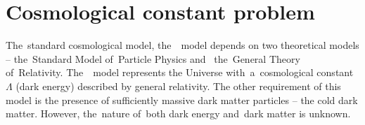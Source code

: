 \section{Cosmological constant problem}
The~standard cosmological model, the~\LCDM\ model depends on two theoretical models -- the~Standard Model of~Particle Physics and~ the~General Theory of~Relativity. The~\LCDM\ model represents the Universe with~a~cosmological constant \(\Lambda\) (dark energy) described by general relativity. The other requirement of this model is the presence of sufficiently massive dark matter particles -- the cold dark matter. However, the~nature of~both dark energy and~dark matter is unknown.




